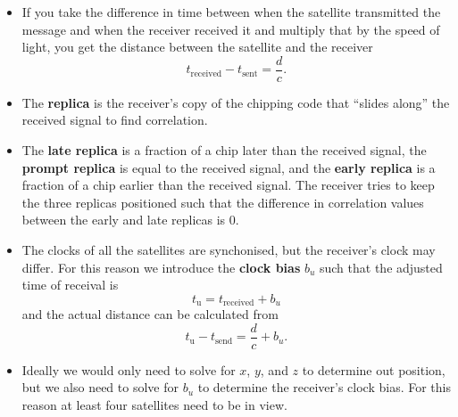 \documentclass{article}
\begin{document}
\begin{itemize}
  \item If you take the difference in time between when the satellite transmitted the message and when the receiver received it and multiply that by the speed of light, you get the distance between the satellite and the receiver \[t_\text{received} - t_\text{sent} = \frac{d}{c}.\]

  \item The \textbf{replica} is the receiver's copy of the chipping code that ``slides along'' the received signal to find correlation.

  \item The \textbf{late replica} is a fraction of a chip later than the received signal, the \textbf{prompt replica} is equal to the received signal, and the \textbf{early replica} is a fraction of a chip earlier than the received signal. The receiver tries to keep the three replicas positioned such that the difference in correlation values between the early and late replicas is $0$.

  \item The clocks of all the satellites are synchonised, but the receiver's clock may differ. For this reason we introduce the \textbf{clock bias} $b_u$ such that the adjusted time of receival is \[t_\text{u} = t_\text{received} + b_u\] and the actual distance can be calculated from \[t_\text{u} - t_\text{send} = \frac{d}{c} + b_u.\]

  \item Ideally we would only need to solve for $x$, $y$, and $z$ to determine out position, but we also need to solve for $b_u$ to determine the receiver's clock bias. For this reason at least four satellites need to be in view.
\end{itemize}
\end{document}
